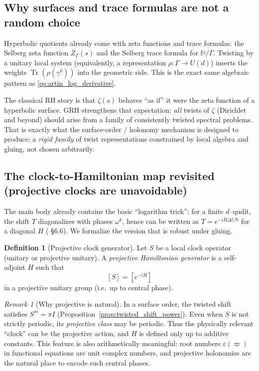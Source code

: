 \documentclass[11pt,oneside]{amsbook}
\numberwithin{equation}{section}
\theoremstyle{plain}
\theoremstyle{definition}
\newtheorem{definition}[theorem]{Definition}
\theoremstyle{remark}
\newtheorem{remark}[theorem]{Remark}
\newcommand{\HH}{\mathbb{H}}
\DeclareMathOperator{\Tr}{\mathrm{Tr}}
\begin{document}
\subsection{Why surfaces and trace formulas are not a random choice}
\label{sec:why_surfaces_GRH}

Hyperbolic quotients already come with zeta functions and trace formulas:
the Selberg zeta function $Z_\Gamma(s)$ and the Selberg trace formula for $\HH/\Gamma$.
Twisting by a unitary local system (equivalently, a representation $\rho:\Gamma\to U(d)$) inserts the weights $\Tr(\rho(\gamma^k))$ into the geometric side.
This is the exact same algebraic pattern as \eqref{eq:artin_log_derivative}.

The classical RH story is that $\zeta(s)$ behaves ``as if'' it were the zeta function of a hyperbolic surface.
GRH strengthens that expectation: \emph{all} twists of $\zeta$ (Dirichlet and beyond) should arise from a family of consistently twisted spectral problems.
That is exactly what the surface-order / holonomy mechanism is designed to produce: a \emph{rigid family} of twist representations constrained by local algebra and gluing, not chosen arbitrarily.

\subsection{The clock-to-Hamiltonian map revisited (projective clocks are unavoidable)}
\label{sec:clock_to_H}

The  main body already contains the basic ``logarithm trick'':
for a finite $d$--qudit, the shift $T$ diagonalizes with phases $\omega^k$, hence can be written as $T=e^{-iH\Delta t/\hbar}$ for a diagonal $H$ ( \S6.6).
We formalize the version that is robust under gluing.

\begin{definition}[Projective clock generator]
Let $S$ be a local clock operator (unitary or projective unitary).
A \emph{projective Hamiltonian generator} is a self-adjoint $H$ such that
\[
[S]=[e^{-iH}]
\]
in a projective unitary group (i.e.\ up to central phase).
\end{definition}

\begin{remark}[Why projective is natural]
In a surface order, the twisted shift satisfies $S^m=\pi I$ (Proposition~\ref{prop:twisted_shift_power}).
Even when $S$ is not strictly periodic, its \emph{projective class} may be periodic.
Thus the physically relevant ``clock'' can be the projective action, and $H$ is defined only up to additive constants.
This feature is also arithmetically meaningful: root numbers $\varepsilon(\varpi)$ in functional equations are unit complex numbers, and projective holonomies are the natural place to encode such central phases.
\end{remark}
\end{document}
